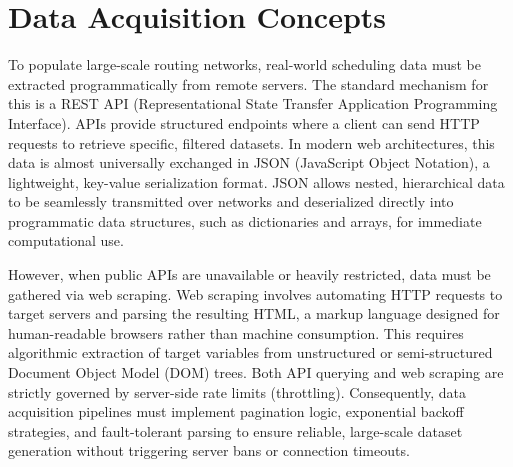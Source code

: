 \section{Data Acquisition Concepts}
\label{sec:data_acquisition_concepts}
To populate large-scale routing networks, real-world scheduling data must be extracted programmatically from remote servers. The standard mechanism for this is a REST API (Representational State Transfer Application Programming Interface). APIs provide structured endpoints where a client can send HTTP requests to retrieve specific, filtered datasets. In modern web architectures, this data is almost universally exchanged in JSON (JavaScript Object Notation), a lightweight, key-value serialization format. JSON allows nested, hierarchical data to be seamlessly transmitted over networks and deserialized directly into programmatic data structures, such as dictionaries and arrays, for immediate computational use.

\medskip

However, when public APIs are unavailable or heavily restricted, data must be gathered via web scraping. Web scraping involves automating HTTP requests to target servers and parsing the resulting HTML, a markup language designed for human-readable browsers rather than machine consumption. This requires algorithmic extraction of target variables from unstructured or semi-structured Document Object Model (DOM) trees. Both API querying and web scraping are strictly governed by server-side rate limits (throttling). Consequently, data acquisition pipelines must implement pagination logic, exponential backoff strategies, and fault-tolerant parsing to ensure reliable, large-scale dataset generation without triggering server bans or connection timeouts.
